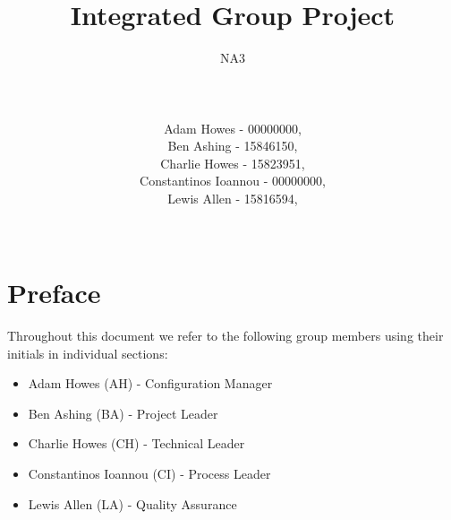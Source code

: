 \documentclass[a4paper]{article}
\title{\vspace{-2cm}Integrated Group Project}
\author{NA3
	\\ \rule{5cm}{0.4pt}
	\\Adam Howes - 00000000,
	\\Ben Ashing - 15846150,
	\\Charlie Howes - 15823951,
	\\Constantinos Ioannou - 00000000,
	\\Lewis Allen - 15816594,
    \\ \rule{5cm}{0.4pt}
} %
\begin{document}
\maketitle

\tableofcontents

\break

\section{Preface}
Throughout this document we refer to the following group members using their initials in individual sections:
\begin{itemize}
    \item Adam Howes (AH) - Configuration Manager 
    \item Ben Ashing (BA) - Project Leader
    \item Charlie Howes (CH) - Technical Leader
    \item Constantinos Ioannou (CI) - Process Leader
    \item Lewis Allen (LA) - Quality Assurance
\end{itemize}
\end{document}
